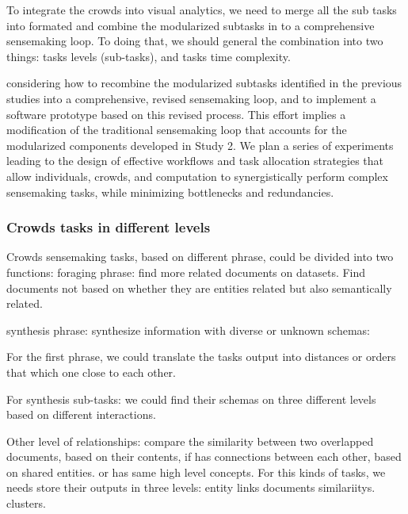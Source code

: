 \documentclass[journal]{vgtc}                %
\begin{document}
To integrate the crowds into visual analytics, we need to merge all the sub tasks into formated and combine the modularized subtasks in to a comprehensive sensemaking loop. To doing that, we should general the combination into two things: tasks levels (sub-tasks), and  tasks time complexity.

considering how to recombine the modularized subtasks identified in the previous studies into a comprehensive, revised sensemaking loop, and to implement a software prototype based on this revised process.
This effort implies a modification of the traditional sensemaking loop that accounts for the modularized components developed in Study 2.
We plan a series of experiments leading to the design of effective workflows and task allocation strategies that allow individuals, crowds, and computation to synergistically perform complex sensemaking tasks, while minimizing bottlenecks and redundancies.


\subsubsection{Crowds tasks in different levels}

Crowds sensemaking tasks, based on different phrase, could be divided into two functions: foraging phrase: find more related documents on datasets.  Find documents not based on whether they are entities related but also semantically related.

synthesis phrase: synthesize information with diverse or unknown schemas:

For the first phrase, we could translate the tasks output into distances or orders that which one close to each other.

For synthesis sub-tasks: we could find their schemas on three different levels based on different interactions.

Other level of relationships: compare the similarity between two overlapped documents, based on their contents, if has connections between each other, based on shared entities. or has same high level concepts. For this kinds of tasks, we needs store their outputs in three levels:
entity links
documents similariitys.
clusters.
\end{document}
